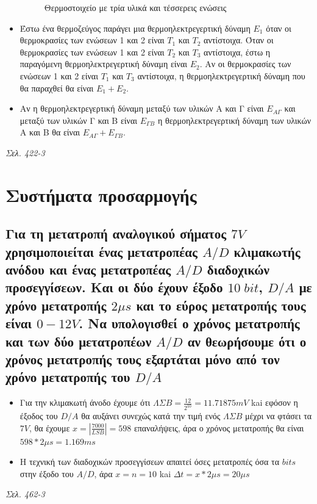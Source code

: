 \documentclass{article}
\begin{document}
\begin{itemize}
\begin{figure}[h!]
            \caption{Θερμοστοιχείο με τρία υλικά και τέσσερεις ενώσεις}
            \label{fig:7.1thermo2}
        \end{figure}
    \item Έστω ένα θερμοζεύγος παράγει μια θερμοηλεκτρεγερτική δύναμη $Ε_1$ όταν οι θερμοκρασίες των ενώσεων 1 και 2 είναι $Τ_1$ και $Τ_2$ αντίστοιχα. Όταν οι θερμοκρασίες των ενώσεων
        1 και 2 είναι $Τ_2$ και $Τ_3$ αντίστοιχα, έστω η παραγόμενη θερμοηλεκτρεγερτική δύναμη είναι $Ε_2$. Αν οι θερμοκρασίες των ενώσεων 1 και 2 είναι $Τ_1$ και $Τ_3$ αντίστοιχα, η
        θερμοηλεκτρεγερτική δύναμη που θα παραχθεί θα είναι $Ε_1+Ε_2$.
    \item Αν η θερμοηλεκτρεγερτική δύναμη μεταξύ των υλικών Α και Γ είναι $Ε_{A\Gamma}$ και μεταξύ των υλικών Γ και Β είναι $Ε_{\Gamma B}$ η θερμοηλεκτρεγερτική δύναμη των
        υλικών Α και Β θα είναι $Ε_{A\Gamma} + E_{\Gamma B}$.
\end{itemize}

\emph{Σελ. 422-3}
\section{Συστήματα προσαρμογής}
\subsection{Για τη μετατροπή αναλογικού σήματος $7V$ χρησιμοποιείται ένας μετατροπέας $A/D$ κλιμακωτής ανόδου και ένας μετατροπέας $Α/D$ διαδοχικών προσεγγίσεων. Και οι δύο έχουν έξοδο 
$10\; bit$, $D/A$ με χρόνο μετατροπής $2\mu s$ και το εύρος μετατροπής τους είναι $0-12V$. Να υπολογισθεί ο χρόνος μετατροπής και των δύο μετατροπέων $A/D$ αν θεωρήσουμε ότι ο χρόνος
μετατροπής τους εξαρτάται μόνο από τον χρόνο μετατροπής του $D/A$}
    
\begin{itemize}
    \item Για την κλιμακωτή άνοδο έχουμε ότι $ΛΣΒ = \frac{12}{2^{10}} = 11.71875mV$ kai εφόσον η έξοδος του $D/A$ θα αυξάνει συνεχώς κατά την τιμή ενός $ΛΣΒ$ μέχρι να φτάσει τα $7V$, 
        θα έχουμε $x = |\frac{7000}{LSB}| = 598$ επαναλήψεις, άρα ο χρόνος μετατροπής θα είναι $598*2\mu s = 1.169ms$
    \item Η τεχνική των διαδοχικών προσεγγίσεων απαιτεί όσες μετατροπές όσα τα $bits$ στην έξοδο του $A/D$, άρα $x = n = 10$ kai $\Delta t = x * 2\mu s = 20\mu s$
\end{itemize}
\emph{Σελ. 462-3}
\end{document}
